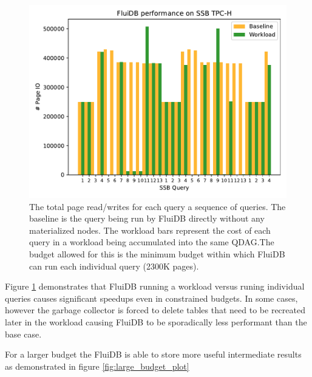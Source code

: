 \newcommand{\ioperfdescr}{The total page read/writes for
  each query a sequence of queries. The baseline is the query being
  run by FluiDB directly without any materialized nodes. The workload
  bars represent the cost of each query in a workload being
  accumulated into the same QDAG.}
\begin{figure}[p]
\centering
\includegraphics[width=.9\linewidth]{./plans/io_perf_23000.pdf}
\caption{\label{fig:min_budget_plot} \ioperfdescr The budget allowed
  for this is the minimum budget within which FluiDB can run each
  individual query (2300K pages).}
\end{figure}

Figure \ref{fig:min_budget_plot} demonstrates that FluiDB running a
workload versus runing individual queries causes significant speedups
even in constrained budgets. In some cases, however the garbage
collector is forced to delete tables that need to be recreated later
in the workload causing FluiDB to be sporadically less performant than
the base case.

For a larger budget the FluiDB is able to store more useful
intermediate results as demonstrated in figure \ref{fig:large_budget_plot}

